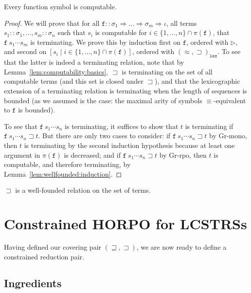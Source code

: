 \documentclass[a4paper,USenglish,cleveref,autoref,thm-restate]{lipics-v2021}
\newcommand{\arrtype}{\Rightarrow}
\newcommand{\grmain}{\sqsupset}
\newcommand{\geqmain}{\sqsupseteq}
\newcommand{\ismain}{\approx}
\newcommand{\grpred}{\rhd}
\newcommand{\eqpred}{\equiv}
\newcommand{\symb}[1]{\mathtt{#1}}
\newcommand{\afun}{\symb{f}}
\newcommand{\atype}{\sigma}
\newcommand{\asort}{\iota}
\newcommand{\filter}{\pi}
\begin{document}
\begin{lemma}\label{lem:functionscomputable}
Every function symbol is computable.
\end{lemma}

\begin{proof}
We will prove that for all $\afun :: \atype_1 \arrtype \dots \arrtype \atype_m \arrtype \asort$,
all terms $s_1 :: \atype_1,\dots,s_m :: \atype_n$ such that $s_i$ is computable for $i \in
\{1,\dots,n\} \cap \filter(\afun)$, that $\afun\ s_1 \cdots s_m$ is terminating.
We prove this by induction first on $\afun$, ordered with $\grpred$, and second on
$[s_i \mid i \in \{1,\dots,n\} \cap \filter(\afun)]$, ordered with
$(\ismain,\grmain)_{\mathtt{lex}}$.
To see that the latter is indeed a terminating relation, note that by
Lemma~\ref{lem:computability:basics}, $\grmain$ is terminating on the set of all computable terms
(and this set is closed under $\grmain$), and that the lexicographic extension of a terminating
relation is terminating when the length of sequences is bounded (as we assumed is the case: the
maximal arity of symbols $\eqpred$-equivalent to $\afun$ is bounded).

To see that $\afun\ s_1 \cdots s_n$ is terminating, it suffices to show that $t$ is terminating if
$\afun\ s_1 \cdots s_n \grmain t$.  But there are only two cases to consider: if $\afun\ s_1 \cdots
s_n \grmain t$ by Gr-mono, then $t$ is terminating by the second induction hypothesis because at
least one argument in $\filter(\afun)$ is decreased; and if $\afun\ s_1 \cdots s_n \grmain t$ by
Gr-rpo, then $t$ is computable, and therefore terminating, by Lemma~\ref{lem:wellfounded:induction}.
\end{proof}

\begin{corollary}
$\grmain$ is a well-founded relation on the set of terms.
\end{corollary}

\section{Constrained HORPO for LCSTRSs}\label{sec:constrained}

Having defined our covering pair $(\geqmain,\grmain)$, we are now ready to define a constrained
reduction pair.

\subsection{Ingredients}
\end{document}
